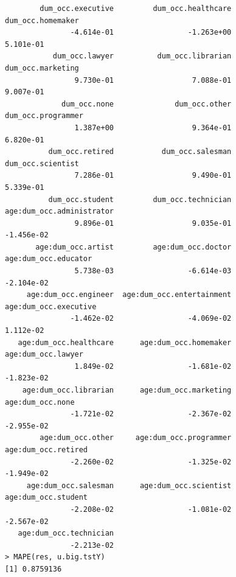 \documentclass[11pt]{article}
\begin{document}
\begin{verbatim}
        dum_occ.executive         dum_occ.healthcare          dum_occ.homemaker  
               -4.614e-01                 -1.263e+00                  5.101e-01  
           dum_occ.lawyer          dum_occ.librarian          dum_occ.marketing  
                9.730e-01                  7.088e-01                  9.007e-01  
             dum_occ.none              dum_occ.other         dum_occ.programmer  
                1.387e+00                  9.364e-01                  6.820e-01  
          dum_occ.retired           dum_occ.salesman          dum_occ.scientist  
                7.286e-01                  9.490e-01                  5.339e-01  
          dum_occ.student         dum_occ.technician  age:dum_occ.administrator  
                9.896e-01                  9.035e-01                 -1.456e-02  
       age:dum_occ.artist         age:dum_occ.doctor       age:dum_occ.educator  
                5.738e-03                 -6.614e-03                 -2.104e-02  
     age:dum_occ.engineer  age:dum_occ.entertainment      age:dum_occ.executive  
               -1.462e-02                 -4.069e-02                  1.112e-02  
   age:dum_occ.healthcare      age:dum_occ.homemaker         age:dum_occ.lawyer  
                1.849e-02                 -1.681e-02                 -1.823e-02  
    age:dum_occ.librarian      age:dum_occ.marketing           age:dum_occ.none  
               -1.721e-02                 -2.367e-02                 -2.955e-02  
        age:dum_occ.other     age:dum_occ.programmer        age:dum_occ.retired  
               -2.260e-02                 -1.325e-02                 -1.949e-02  
     age:dum_occ.salesman      age:dum_occ.scientist        age:dum_occ.student  
               -2.208e-02                 -1.081e-02                 -2.567e-02  
   age:dum_occ.technician  
               -2.213e-02  
> MAPE(res, u.big.tstY)
[1] 0.8759136
\end{verbatim}
\end{document}
